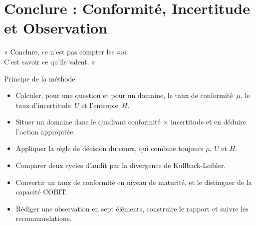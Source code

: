 
\chapter[Conclure]{Conclure : Conformité, Incertitude et Observation}
\label{chap:conclure}

\epigraph{%
    « Conclure, ce n'est pas compter les \emph{oui}.\\
    C'est savoir ce qu'ils valent. »%
}{Principe de la méthode}


\begin{boxobjectifs}
\begin{itemize}
    \item Calculer, pour une question et pour un domaine, le taux de
          conformité~$\mu$, le taux d'incertitude~$U$ et l'entropie~$H$.
    \item Situer un domaine dans le quadrant conformité × incertitude et en
          déduire l'action appropriée.
    \item Appliquer la règle de décision du cours, qui combine toujours
          $\mu$, $U$ et $H$.
    \item Comparer deux cycles d'audit par la divergence de Kullback-Leibler.
    \item Convertir un taux de conformité en niveau de maturité, et le
          distinguer de la capacité COBIT.
    \item Rédiger une observation en sept éléments, construire le rapport et
          suivre les recommandations.
\end{itemize}
\end{boxobjectifs}

